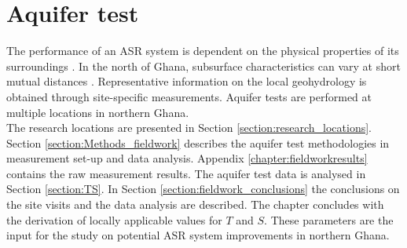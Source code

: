 \chapter{Aquifer test}
\label{chapter:Fieldwork_data_analysis}

The performance of an ASR system is dependent on the physical properties of its surroundings \citep{Bakker2010}. In the north of Ghana, subsurface characteristics can vary at short mutual distances  \citep{Owusu2017}. Representative information on the local geohydrology is obtained through site-specific measurements. Aquifer tests are performed at multiple locations in northern Ghana. \\
The research locations are presented in Section \ref{section:research_locations}. Section \ref{section:Methods_fieldwork} describes the aquifer test methodologies in measurement set-up and data analysis. Appendix \ref{chapter:fieldworkresults} contains the raw measurement results. The aquifer test data is analysed in Section \ref{section:TS}. In Section \ref{section:fieldwork_conclusions} the conclusions on the site visits and the data analysis are described. The chapter concludes with the derivation of locally applicable values for $T$ and $S$. These parameters are the input for the study on potential ASR system improvements in northern Ghana. 
%
%
%
